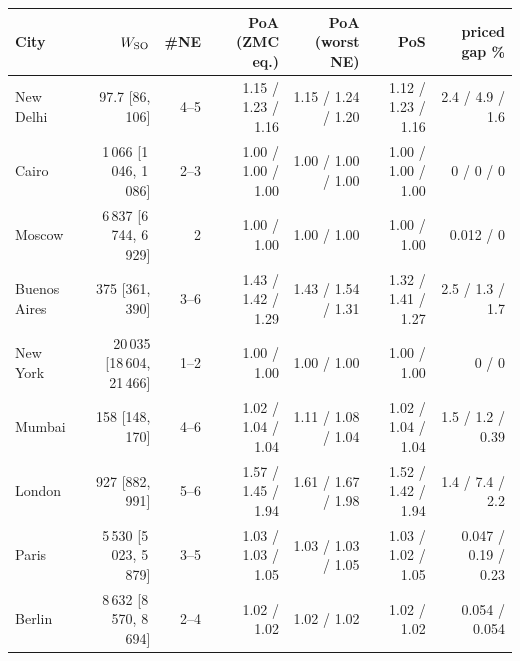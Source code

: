 \begin{tabular}{lrrrrrr}
\toprule
City & $W_{\rm SO}$ & \#NE & PoA (ZMC eq.) & PoA (worst NE) & PoS & priced gap \% \\
\midrule
New Delhi & 97.7 [86, 106] & 4--5 & 1.15 / 1.23 / 1.16 & 1.15 / 1.24 / 1.20 & 1.12 / 1.23 / 1.16 & 2.4 / 4.9 / 1.6 \\
Cairo & 1\,066 [1\,046, 1\,086] & 2--3 & 1.00 / 1.00 / 1.00 & 1.00 / 1.00 / 1.00 & 1.00 / 1.00 / 1.00 & 0 / 0 / 0 \\
Moscow & 6\,837 [6\,744, 6\,929] & 2 & 1.00 / 1.00 & 1.00 / 1.00 & 1.00 / 1.00 & 0.012 / 0 \\
Buenos Aires & 375 [361, 390] & 3--6 & 1.43 / 1.42 / 1.29 & 1.43 / 1.54 / 1.31 & 1.32 / 1.41 / 1.27 & 2.5 / 1.3 / 1.7 \\
New York & 20\,035 [18\,604, 21\,466] & 1--2 & 1.00 / 1.00 & 1.00 / 1.00 & 1.00 / 1.00 & 0 / 0 \\
Mumbai & 158 [148, 170] & 4--6 & 1.02 / 1.04 / 1.04 & 1.11 / 1.08 / 1.04 & 1.02 / 1.04 / 1.04 & 1.5 / 1.2 / 0.39 \\
London & 927 [882, 991] & 5--6 & 1.57 / 1.45 / 1.94 & 1.61 / 1.67 / 1.98 & 1.52 / 1.42 / 1.94 & 1.4 / 7.4 / 2.2 \\
Paris & 5\,530 [5\,023, 5\,879] & 3--5 & 1.03 / 1.03 / 1.05 & 1.03 / 1.03 / 1.05 & 1.03 / 1.02 / 1.05 & 0.047 / 0.19 / 0.23 \\
Berlin & 8\,632 [8\,570, 8\,694] & 2--4 & 1.02 / 1.02 & 1.02 / 1.02 & 1.02 / 1.02 & 0.054 / 0.054 \\
\bottomrule
\end{tabular}

